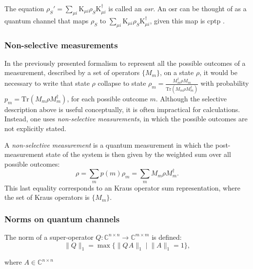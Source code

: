 \begin{definition}
  The equation $ \rho_{S}' = \sum_{\mu i} \text{K}_{\mu i} \rho_{S} \text{K}_{\mu i}^{\dag} $ is called an \emph{\acrfull{osr}}. An \acrshort{osr} can be thought of as a quantum channel that maps $\rho_{S}$ to $\sum_{\mu i} \text{K}_{\mu i} \rho_{S} \text{K}_{\mu i}^{\dag}$, given this map is \acrshort{cptp} \cite{lidar2019lecture, watrous2018theory}. 
\end{definition}




\subsubsection{Non-selective measurements}

In the previously presented formalism to represent all the possible outcomes of a measurement, described by a set of operators $\{M_{m}\}$, on a state $\rho$, it would be necessary to write that state $\rho$ collapse to state $\rho_m=\frac{M_{m}^{\dag}\rho M_{m}}{\text{Tr}(M_{m}\rho M_{m}^{\dag})}$ with probability $p_m=\text{Tr}(M_{m}\rho M_{m}^{\dag})$, for each possible outcome $m$. Although the selective description above is useful conceptually, it is often impractical for calculations. Instead, one uses \emph{non-selective measurements}, in which the possible outcomes are not explicitly stated.


\begin{definition}
A \emph{non-selective measurement} is a quantum measurement in which the post-measurement state of the system is then given by the weighted sum over all possible outcomes:
\[
\rho = \sum_m p(m) \rho_m = \sum_m M_m \rho M_m^{\dag}.
\]
This last equality corresponds to an Kraus operator sum representation, where the set of Kraus operators is $\{M_{m}\}$.
\end{definition}



\subsubsection{Norms on quantum channels}
\begin{definition} \label{def:trace_norm_superoperator}
  The norm of a super-operator $Q: \mathbb{C}^{n\times n} \xrightarrow{} \mathbb{C}^{m\times m }$ is defined:
  \begin{equation*} 
    \lVert Q \rVert_{1} =  \max\{\lVert Q \hspace{1pt} A \rVert_{1}   \mid  \lVert A \rVert_{1}=1\}, 
  \end{equation*}
\end{definition}
where $A \in \mathbb{C}^{n \times n }$

